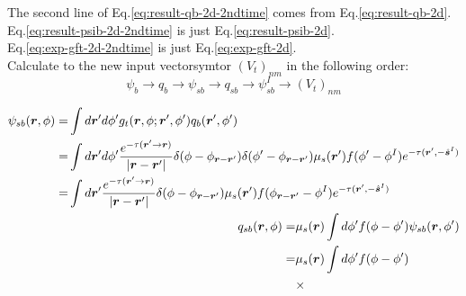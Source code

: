 \documentclass [10pt,letterpaper]{article}
\newcommand{\unitvectorsym}[1]{\hat{\vectorsym{#1}}}
\begin{document}
The second line of Eq.\eqref{eq:result-qb-2d-2ndtime} comes from Eq.\eqref{eq:result-qb-2d}.
\\
Eq.\eqref{eq:result-psib-2d-2ndtime} is just Eq.\eqref{eq:result-psib-2d}.
\\
Eq.\eqref{eq:exp-gft-2d-2ndtime} is just Eq.\eqref{eq:exp-gft-2d}.
\\
Calculate to the new input vectorsymtor $(V_t)_{n m}$ in the following order:
\begin{equation} \label{eq:order-in-which-Vtnm-1pt-is-calculated}
	\psi_b
	\to
	q_b
	\to
	\psi_{sb}
	\to
	q_{sb}
	\to
	\psi_{sb}^I
	\to
	(V_t)_{n m}
\end{equation}

\begin{subequations} \label{eq:result-psisb-qsb-psisbI-2d}
	\begin{align} 
		\begin{split}
			\psi_{sb}(\vectorsym{r},\phi)
			=&
			\int d\vectorsym{r}^\prime d\phi^\prime
			g_t(\vectorsym{r},\phi;\vectorsym{r}^\prime,\phi^\prime)
			q_b(\vectorsym{r}^\prime,\phi^\prime)
			\\
			=& 
			\int d\vectorsym{r}^\prime d\phi^\prime
			\frac
			{e^{-\tau(\vectorsym{r}^\prime\to\vectorsym{r})}}
			{\lvert \vectorsym{r}-\vectorsym{r}^\prime \rvert}
			\delta(\phi-\phi_{\vectorsym{r}-\vectorsym{r}^\prime})
			\delta(\phi^\prime-\phi_{\vectorsym{r}-\vectorsym{r}^\prime})
			\mu_s(\vectorsym{r}^\prime)
			f(\phi^\prime-\phi^I)
			e^{-\tau(\vectorsym{r}^\prime,-\unitvectorsym{s}^I)} 
			\\
			=& 
			\int d\vectorsym{r}^\prime
			\frac
			{e^{-\tau(\vectorsym{r}^\prime\to\vectorsym{r})}}
			{\lvert \vectorsym{r}-\vectorsym{r}^\prime \rvert}
			\delta(\phi-\phi_{\vectorsym{r}-\vectorsym{r}^\prime})
			\mu_s(\vectorsym{r}^\prime)
			f(\phi_{\vectorsym{r}-\vectorsym{r}^\prime}-\phi^I)
			e^{-\tau(\vectorsym{r}^\prime,-\unitvectorsym{s}^I)} 
		\end{split}
		\label{eq:result-psisb-2d}
		\\
		\begin{split} 
			q_{sb}(\vectorsym{r},\phi)
			=&
			\mu_s(\vectorsym{r})
			\int d\phi^\prime
			f(\phi-\phi^\prime)
			\psi_{sb}(\vectorsym{r},\phi^\prime)
			\\
			=&
			\mu_s(\vectorsym{r})
			\int d\phi^\prime
			f(\phi-\phi^\prime)
			\\
			&
			\times

\end{split}
\end{align}
\end{subequations}
\end{document}
